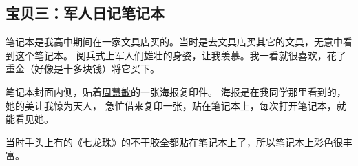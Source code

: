 \endgroup


\subsection{宝贝三：军人日记笔记本}

笔记本是我高中期间在一家文具店买的。当时是去文具店买其它的文具，无意中看到这个笔记本。
阅兵式上军人们雄壮的身姿，让我羡慕。我一看就很喜欢，花了重金（好像是十多块钱）将它买下。

笔记本封面内侧，贴着\href{https://baike.baidu.com/item/周慧敏/6702}{周慧敏}的一张海报复印件。
海报是在我同学那里看到的，她的美让我惊为天人，
急忙借来复印一张，贴在笔记本上，每次打开笔记本，就能看见她。

当时手头上有的《七龙珠》的不干胶全都贴在笔记本上了，所以笔记本上彩色很丰富。

